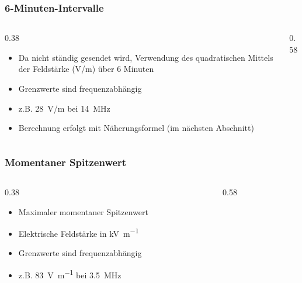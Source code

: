 \begin{frame}
    \frametitle{6-Minuten-Intervalle}
    \begin{columns}
        \begin{column}{0.38\linewidth}
            \begin{itemize}
                \item Da nicht ständig gesendet wird, Verwendung des quadratischen Mittels der Feldstärke (V/m) über 6 Minuten
                \item Grenzwerte sind frequenzabhängig
                \item z.B. \qty{28}{\volt}/m bei \qty{14}{\mega\hertz}
                \item Berechnung erfolgt mit Näherungsformel (im nächsten Abschnitt)
            \end{itemize}
        \end{column}
        \begin{column}{0.58\linewidth}
        \end{column}
    \end{columns}
\end{frame}

\begin{frame}
    \frametitle{Momentaner Spitzenwert}
    \begin{columns}
        \begin{column}{0.38\linewidth}
            \begin{itemize}
                \item Maximaler momentaner Spitzenwert
                \item Elektrische Feldstärke in \unit{\kilo\volt\per\metre}
                \item Grenzwerte sind frequenzabhängig
                \item z.B. \qty{83}{\volt\per\metre} bei \qty{3,5}{\mega\hertz}
            \end{itemize}
        \end{column}
        \begin{column}{0.58\linewidth}
        \end{column}
    \end{columns}
\end{frame}


